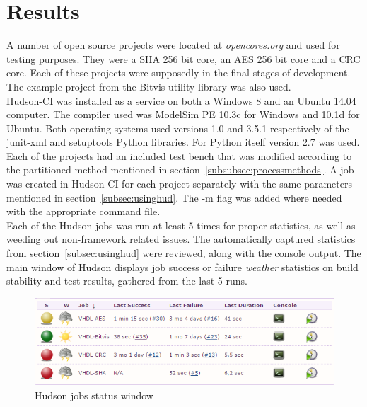 \documentclass[11pt,british]{article}
\begin{document}
\section{Results}
A number of open source projects were located at \emph{opencores.org} and used for testing purposes. They were a \gls{SHA} 256 bit core, an \gls{AES} 256 bit core and a \gls{CRC} core. Each of these projects were supposedly in the final stages of development. The example project from the Bitvis utility library was also used.
\\[\baselineskip]
Hudson-CI was installed as a service on both a Windows 8 and an Ubuntu 14.04 computer. The compiler used was ModelSim PE 10.3c for Windows and 10.1d for Ubuntu. Both operating systems used versions 1.0 and 3.5.1 respectively of the junit-xml and setuptools Python libraries. For Python itself version 2.7 was used.
\\[\baselineskip]
Each of the projects had an included test bench that was modified according to the partitioned method mentioned in section~\ref{subsubsec:processmethods}. A job was created in Hudson-CI for each project separately with the same parameters mentioned in section~\ref{subsec:usinghud}. The -m flag was added where needed with the appropriate command file.
\\[\baselineskip]
Each of the Hudson jobs was run at least 5 times for proper statistics, as well as weeding out non-framework related issues. The automatically captured statistics from section~\ref{subsec:usinghud} were reviewed, along with the console output. The main window of Hudson displays job success or failure \emph{weather} statistics on build stability and test results, gathered from the last 5 runs.

\begin{figure}[h]
    \centering
	\includegraphics[width=\textwidth]{images/jobs.png}
    \caption{Hudson jobs status window}
    \label{fig:hudsonjobs}
\end{figure}
\end{document}

